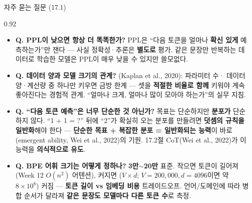 \begin{frame}[shrink=20]{자주 묻는 질문 (17.1)}
\begin{center}\begin{varwidth}{0.92\textwidth}
  \begin{itemize}
    \item \textbf{Q. PPL이 낮으면 항상 더 똑똑한가?} PPL은
      ``다음 토큰을 얼마나 \textbf{확신 있게} 예측하는가''만
      잰다 — 사실 정확성·추론은 \textbf{별도로} 평가. 같은
      문장만 반복하는 데이터로 학습한 모델은 PPL이 매우 낮을
      수 있지만 쓸모없다. 
    \item \textbf{Q. 데이터 양과 모델 크기의 관계?}
      (Kaplan et al., 2020): 파라미터 수·
      데이터 양·계산량 중 하나만 키우면 금방 한계 --- 셋을
      \textbf{적절한 비율로 함께} 키워야 계속 좋아진다는
      경험적 관계. ``얼마나 크게, 얼마나 많이 모아야 하는가''의
      실무 지침.
    \item \textbf{Q. ``다음 토큰 예측''은 너무 단순한
      것 아닌가?} 목표는 단순하지만 \textbf{분포가} 단순하지
      않다. ``1 + 1 = ?'' 뒤에 ``2''가 확실히 오는 분포를
      만들려면 \textbf{덧셈의 규칙을 일반화}해야 한다 ---
      \textbf{단순한 목표 + 복잡한 분포 = 일반화되는 능력}이
      바로 (emergent ability, Wei et al., 2022)의
      기원. 17.2절 CoT(Wei et al., 2022)가 이 능력을
      \textbf{의식적으로 유도}.
    \item \textbf{Q. BPE 어휘 크기는 어떻게 정하나?}
      \textbf{3만$\sim$20만} 표준. 작으면 토큰이 길어져
      (Week 12 $O(n^2)$ 어텐션), 커지면
      ($V \times d$; $V=200{,}000,
      d=4096$이면 약 $8 \times 10^8$) 커짐 — \textbf{토큰
      길이 vs 임베딩 비용} 트레이드오프. 언어/도메인에 따라
      병합 순서가 달라져 \textbf{같은 문장도 모델마다 다른
      토큰 수}로 측정.
  \end{itemize}
\end{varwidth}\end{center}
\end{frame}
